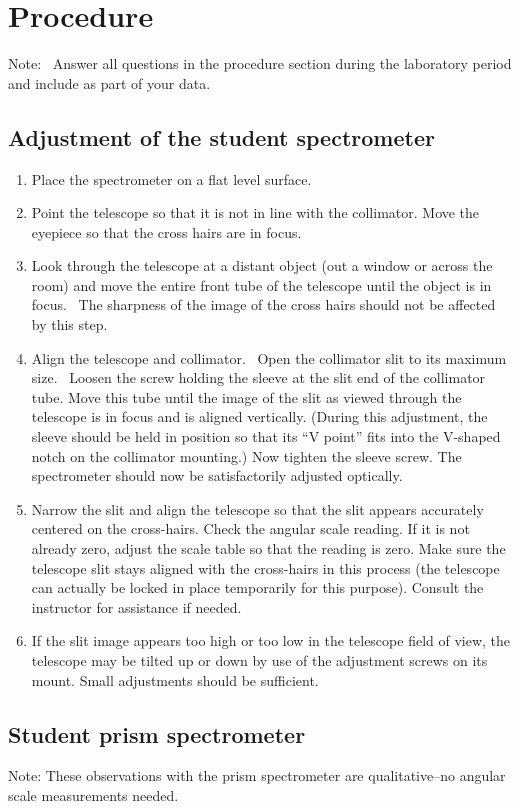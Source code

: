 \documentclass{article}
\begin{document}
\section{Procedure}

Note: \ Answer all questions in the procedure section during the
laboratory period and include as part of your data. 

\subsection{Adjustment of the student spectrometer}
\begin{enumerate}
\item Place the spectrometer on a flat level surface.
\item Point the telescope so that it is not in line with the collimator.
Move the eyepiece so that the cross hairs are in focus.
\item Look through the telescope at a distant object (out a window or
across the room) and move the entire front tube of the telescope until
the object is in focus. \ The sharpness of the image of the cross hairs
should not be affected by this step.
\item Align the telescope and collimator. \ Open the collimator slit to
its maximum size. \ Loosen the screw holding the sleeve at the slit end
of the  collimator tube. Move this tube until the image of the slit as
viewed  through the telescope is in focus and is aligned vertically.
(During this adjustment, the sleeve should be held in position so that
its ``V point'' fits into the V-shaped notch
on the collimator mounting.)  Now tighten the sleeve screw. The
spectrometer should now be satisfactorily adjusted optically.
\item Narrow the slit and align the telescope so that the slit appears
accurately centered on the cross-hairs.  Check the angular scale
reading.
If it is not already zero, adjust the scale table so that the reading is
zero.  Make sure the telescope slit stays aligned with the cross-hairs
in this process (the telescope can actually be locked in place
temporarily for this purpose). Consult the instructor for assistance if
needed.
\item If the slit image appears too high or too low in the telescope
field of view, the telescope may be tilted up or down by use of the
adjustment screws on its mount.  Small adjustments should be
sufficient.
\end{enumerate}

\subsection{Student prism spectrometer}
Note: These observations with the prism spectrometer are
qualitative--no angular scale measurements needed.
\end{document}
